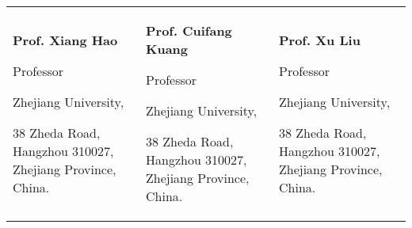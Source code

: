 

\begin{tabularx}{\textwidth}{@{}X X X@{}}
\textbf{Prof. Xiang Hao}\par
Professor\par
Zhejiang University,\par
38 Zheda Road, Hangzhou 310027, Zhejiang Province, China.\par
\makefield{\faEnvelope}{\url{haox@zju.edu.cn}}
&
\textbf{Prof. Cuifang Kuang}\par
Professor\par
Zhejiang University,\par
38 Zheda Road, Hangzhou 310027, Zhejiang Province, China.\par
\makefield{\faEnvelope}{\url{cfkuang@zju.edu.cn}}
&
\textbf{Prof. Xu Liu}\par
Professor\par
Zhejiang University,\par
38 Zheda Road, Hangzhou 310027, Zhejiang Province, China.\par
\makefield{\faEnvelope}{\url{liuxu@zju.edu.cn}}
\\
\end{tabularx}
